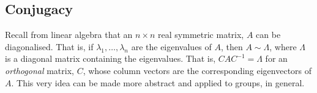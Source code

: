 \begin{comment}
\begin{theorem}
    Every $\sigma \in S_{\Omega}$ can be expressed as a product of disjoint cycles.
\end{theorem}
\begin{proof}
    We define a relation on $S_{\Omega}$ with $a \sim b \iff b = \sigma^k(a)$ for some $k$. One can verify that this defines an equivalence relation on $S_{\Omega}$. Thus, $S_{\Omega}$ is partitioned into equivalence classes $C_{i_1}, \ldots, C_{i_t}$ where $C_{i_k}$ is the equivalence class of $i_k$. In fact, $C_{i_k}$ corresponds to the cycle $i_k, \sigma(i_k), \sigma^2(i_k), \ldots$. This list cannot be infinite since $S_{\Omega}$ is a finite set. Similarly, each equivalence class forms its own cycle. Since the equivalence classes are disjoint, their resulting cycles are also disjoint. Let these $t$ cycles be $\tau_1, \ldots, \tau_t$. We wish to show that $\tau_1 \cdots \tau_t = \sigma$.
\end{proof}

\begin{prop}
        If $\tau_1$ and $\tau_2$ are two disjoint cycles, then $\tau_1 \tau_2 = \tau_2 \tau_1$.
    \end{prop}
    \begin{proof}
        Suppose $\omega \in \Omega$ such that $\tau_1(\omega) = \tau_2(\omega) = \omega$. For this case, it is easy to verify that $\tau_1\tau_2(\omega) = \tau_2\tau_1(\omega) = \omega$. For any $\omega \in \Omega$, if we have $\tau_1(\omega) \neq \omega$ then we must have $\tau_2(\omega) = \omega$ since they are disjoint. Now, $\tau_1\tau_2(\omega) = \tau_1(\omega)$. Also, $\tau_1(\omega)$ does not occur in the cycle of $\tau_2$. Thus, $\tau_2\tau_1(\omega) = \tau_1(\omega)$. A similar argument can be used when $\tau_2(\omega) \neq \omega$. Hence, the claim follows.
    \end{proof}
\end{comment}

\subsection{Conjugacy}

Recall from linear algebra that an $n \times n$ real symmetric matrix, $A$ can be diagonalised. That is, if $\lambda_1, \ldots, \lambda_n$ are the eigenvalues of $A$, then $A \sim \Lambda$, where $\Lambda$ is a diagonal matrix containing the eigenvalues. That is, $C A C^{-1} = \Lambda$ for an \emph{orthogonal} matrix, $C$, whose column vectors are the corresponding eigenvectors of $A$. This very idea can be made more abstract and applied to groups, in general. 

